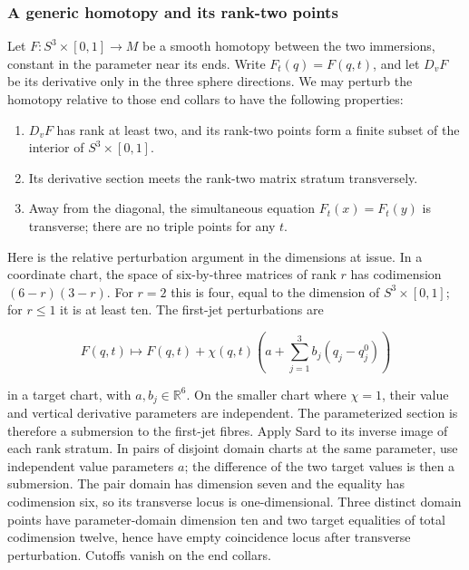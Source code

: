 \subsubsection{A generic homotopy and its rank-two points}
\label{courseIII:the-original-six-dimensional-framing-invariant:section-5.2}

Let \(F:S^3\times[0,1]\to M\) be a smooth homotopy between the two immersions, constant in the parameter near its ends. Write \(F_t(q)=F(q,t)\), and let \(D_vF\) be its derivative only in the three sphere directions. We may perturb the homotopy relative to those end collars to have the following properties:

\begin{enumerate}
\def\labelenumi{\arabic{enumi}.}

\item
  \(D_vF\) has rank at least two, and its rank-two points form a finite subset of the interior of \(S^3\times[0,1]\).
\item
  Its derivative section meets the rank-two matrix stratum transversely.
\item
  Away from the diagonal, the simultaneous equation \(F_t(x)=F_t(y)\) is transverse; there are no triple points for any \(t\).
\end{enumerate}

Here is the relative perturbation argument in the dimensions at issue. In a coordinate chart, the space of six-by-three matrices of rank \(r\) has codimension \((6-r)(3-r)\). For \(r=2\) this is four, equal to the dimension of \(S^3\times[0,1]\); for \(r\le1\) it is at least ten. The first-jet perturbations are

\begin{equation}
F(q,t)\longmapsto
 F(q,t)+\chi(q,t)\left(a+\sum_{j=1}^3 b_j(q_j-q_j^0)\right)
 \label{courseIII:the-original-six-dimensional-framing-invariant:eq:5.7}
\end{equation}

in a target chart, with \(a,b_j\in\mathbb R^6\). On the smaller chart where \(\chi=1\), their value and vertical derivative parameters are independent. The parameterized section is therefore a submersion to the first-jet fibres. Apply Sard to its inverse image of each rank stratum. In pairs of disjoint domain charts at the same parameter, use independent value parameters \(a\); the difference of the two target values is then a submersion. The pair domain has dimension seven and the equality has codimension six, so its transverse locus is one-dimensional. Three distinct domain points have parameter-domain dimension ten and two target equalities of total codimension twelve, hence have empty coincidence locus after transverse perturbation. Cutoffs vanish on the end collars.

